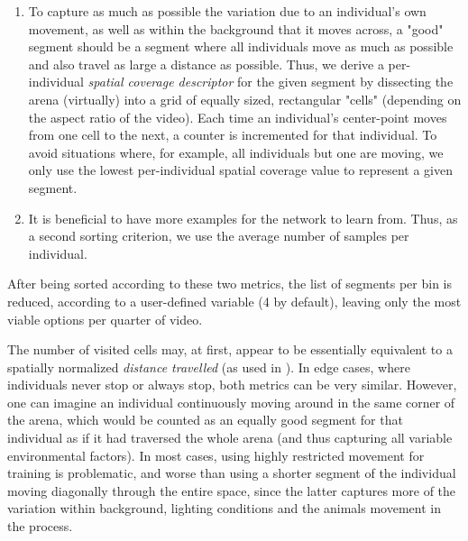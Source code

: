 \documentclass[9pt,lineno]{elife}
\newcommand{\idtracker}{\protect\path{ idtracker.ai}}
\newcommand{\TRex}{\protect\path{TRex}}
\begin{document}
\begin{enumerate}
    \item To capture as much as possible the variation due to an individual's own movement, as well as within the background that it moves across, a "good" segment should be a segment where all individuals move as much as possible and also travel as large a distance as possible. Thus, we derive a per-individual \textit{spatial coverage descriptor} for the given segment by dissecting the arena (virtually) into a grid of equally sized, rectangular "cells" (depending on the aspect ratio of the video). Each time an individual's center-point moves from one cell to the next, a counter is incremented for that individual. To avoid situations where, for example, all individuals but one are moving, we only use the lowest per-individual spatial coverage value to represent a given segment.

    \item It is beneficial to have more examples for the network to learn from. Thus, as a second sorting criterion, we use the average number of samples per individual.
\end{enumerate}

After being sorted according to these two metrics, the list of segments per bin is reduced, according to a user-defined variable (4 by default), leaving only the most viable options per quarter of video.

The number of visited cells may, at first, appear to be essentially equivalent to a spatially normalized \textit{distance travelled} (as used in \idtracker{}). In edge cases, where individuals never stop or always stop, both metrics can be very similar. However, one can imagine an individual continuously moving around in the same corner of the arena, which would be counted as an equally good segment for that individual as if it had traversed the whole arena (and thus capturing all variable environmental factors). In most cases, using highly restricted movement for training is problematic, and worse than using a shorter segment of the individual moving diagonally through the entire space, since the latter captures more of the variation within background, lighting conditions and the animals movement in the process.

\end{document}
